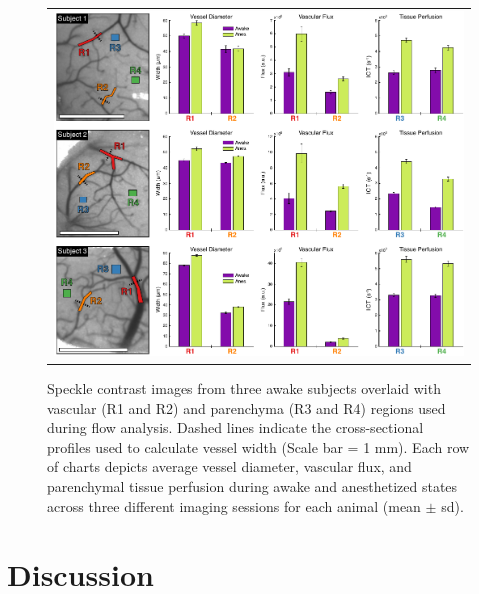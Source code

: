 \documentclass[12pt]{spieman}
\begin{document}
\begin{spacing}{2}
\begin{figure}
    \begin{center}
        \begin{tabular}{c}
            \includegraphics[width=6.25in]{Figure3.pdf}
        \end{tabular}
    \end{center}
    \caption {
        \label{fig:summary}
        Speckle contrast images from three awake subjects overlaid with vascular (R1 and R2) and parenchyma (R3 and R4) regions used during flow analysis. Dashed lines indicate the cross-sectional profiles used to calculate vessel width (Scale bar = 1 mm). Each row of charts depicts average vessel diameter, vascular flux, and parenchymal tissue perfusion during awake and anesthetized states across three different imaging sessions for each animal (mean $\pm$ sd).
    }
\end{figure}


\section{Discussion}
\label{sect:discussion}


\end{spacing}
\end{document}

